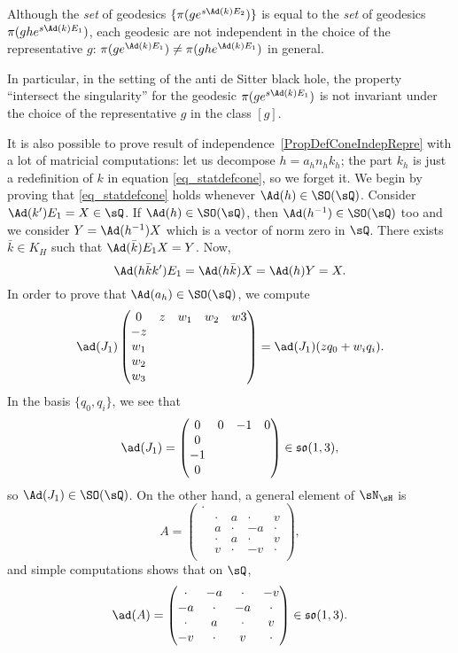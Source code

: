 \begin{remark}		\label{RemGedNonInvarChoix}
	Although the \emph{set} of geodesics $\{ \pi(g e^{s\Ad(k)E_2}) \}$ is equal to the \emph{set} of geodesics $\pi(gh e^{s\Ad(k)E_1})$, each geodesic are not independent in the choice of the representative $g$: $\pi(g e^{\Ad(k)E_1})\neq\pi(gh e^{\Ad(k)E_1})$ in general.

	In particular, in the setting of the anti de Sitter black hole, the property ``intersect the singularity'' for the geodesic $\pi(g e^{s\Ad(k)E_1})$ is not invariant under the choice of the representative $g$ in the class $[g]$.
\end{remark}

It is also possible to prove result of independence~\ref{PropDefConeIndepRepre} with a lot of matricial computations: let us decompose $h=a_hn_hk_h$; the part $k_h$ is just a redefinition of $k$ in equation \eqref{eq_statdefcone}, so we forget it. We begin by proving that \eqref{eq_statdefcone} holds whenever $\Ad(h)\in \SO(\sQ)$. Consider $\Ad(k')E_1=X\in\sQ$. If $\Ad(h)\in \SO(\sQ)$, then $\Ad(h^{-1})\in \SO(\sQ)$ too and we consider $Y=\Ad(h^{-1})X$ which is a vector of norm zero in $\sQ$. There exists $\bar k\in K_H$ such that $\Ad(\bar k)E_1X=Y$. Now,
\begin{equation}
	\Ad(h\bar kk')E_1=\Ad(h\bar k)X
	=\Ad(h)Y
	=X.
\end{equation}
In order to prove that $\Ad(a_h)\in \SO(\sQ)$, we compute
\[
	\ad(J_1)\begin{pmatrix}
		0 & z & w_1 & w_2 & w3 \\
		-z                     \\
		w_1                    \\
		w_2                    \\
		w_3
	\end{pmatrix}
	=\ad(J_1)(zq_0+w_iq_i).
\]
In the basis $\{ q_0,q_i \}$, we see that
\[
	\ad(J_1)=\begin{pmatrix}
		0 & 0 & -1 & 0 \\
		0              \\-1\\0
	\end{pmatrix}\in\mathfrak{so}(1,3),
\]
so $\Ad(J_1)\in \SO(\sQ)$. On the other hand, a general element of $\sN_{\sH}$ is
\[
	A=\begin{pmatrix}
		\cdot                            \\
		 & \cdot & a     & \cdot & v     \\
		 & a     & \cdot & -a    & \cdot \\
		 & \cdot & a     & \cdot & v     \\
		 & v     & \cdot & -v    & \cdot \\
	\end{pmatrix},
\]
and simple computations shows that on $\sQ$,
\[
	\ad(A)=\begin{pmatrix}
		\cdot & -a    & \cdot & -v    \\
		-a    & \cdot & -a    & \cdot \\
		\cdot & a     & \cdot & v     \\
		-v    & \cdot & v     & \cdot
	\end{pmatrix}\in\mathfrak{so}(1,3).
\]

